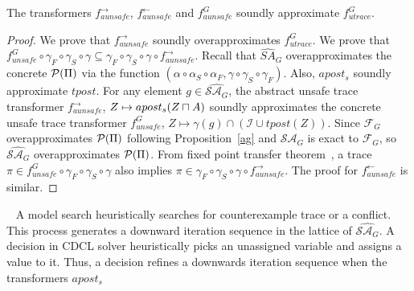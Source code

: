 %
\begin{theorem}
  The transformers $f_{aunsafe}^{\rightarrow}$, $f_{aunsafe}^{\leftarrow}$ and 
  $f_{aunsafe}^{G}$ soundly approximate $f_{utrace}^{G}$.
\end{theorem}
\begin{proof}
 We prove that $f_{aunsafe}^{\rightarrow}$ soundly overapproximates 
 $f_{utrace}^{G}$. 
  We prove that  
  $ f_{unsafe}^{G} \circ \gamma_F \circ \gamma_S \circ \gamma \subseteq 
     \gamma_F \circ \gamma_S \circ \gamma \circ f_{aunsafe}^{\rightarrow} 
  $.
 Recall that $\widehat{SA}_{G}$ overapproximates the concrete
 $\mathcal{P}(\Pi)$ via the function $(\alpha \circ \alpha_S \circ \alpha_F,
 \gamma \circ \gamma_S \circ \gamma_F)$. Also, $apost_s$ soundly approximate
  $tpost$. For any element $g \in \widehat{\mathcal{SA}_{G}}$, the abstract unsafe trace
  transformer $f_{aunsafe}^{\rightarrow}$, $Z \mapsto apost_s(Z \sqcap A)$ 
  soundly approximates the concrete unsafe trace transformer
  $f_{unsafe}^{G}$, $Z \mapsto \gamma(g) \cap (\mathcal{I} \cup tpost(Z))$.
  Since $\mathcal{F}_G$ overapproximates $\mathcal{P}(\Pi)$ following
  Proposition~\ref{ag} and $\mathcal{SA}_G$ is exact to $\mathcal{F}_G$, so
  $\widehat{\mathcal{SA}_G}$ overapproximates $\mathcal{P}(\Pi)$.  From fixed
  point transfer theorem~\cite{fpt}, a trace 
  $\pi \in f_{unsafe}^{G} \circ \gamma_F \circ \gamma_S \circ \gamma$ also
  implies $\pi \in \gamma_F \circ \gamma_S \circ \gamma \circ
  f_{aunsafe}^{\rightarrow}$. The proof for $f_{aunsafe}^{\leftarrow}$ is similar. 
\end{proof}
%
%
%
%
~\label{decision}
%
A model search heuristically searches for counterexample trace or a conflict.
This process generates a downward iteration sequence in the lattice of
$\widehat{\mathcal{SA}_{G}}$.  A decision in CDCL solver heuristically picks 
an unassigned variable and assigns a value to it.  
Thus, a decision refines a downwards iteration sequence when the transformers $apost_{s}$ 
